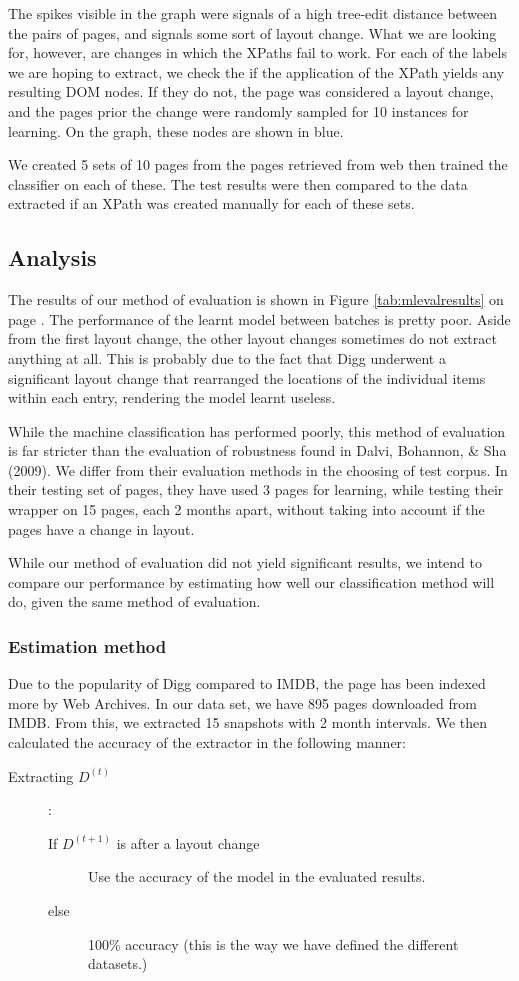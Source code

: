 	The spikes visible in the graph were signals of a high tree-edit distance between the pairs
of pages, and signals some sort of layout change. What we are looking for, however, are changes
in which the XPaths fail to work. For each of the labels we are hoping to extract, we check the
if the application of the XPath yields any resulting DOM nodes. If they do not, the page was
considered a layout change, and the pages prior the change were randomly sampled for 10 instances
for learning. On the graph, these nodes are shown in blue.

	 We created 5 sets of 10 pages from the pages retrieved from web
then trained the classifier on each of these. The test results were then compared to the data
extracted if an XPath was created manually for each of these sets.
 
 
\subsection{Analysis}
	The results of our method of evaluation is shown in Figure \ref{tab:mlevalresults} on page
\pageref{tab:mlevalresults}. The performance of the learnt model between batches is pretty poor.
Aside from the first layout change, the other layout changes sometimes do not extract anything
at all. This is probably due to the fact that Digg underwent a significant layout change that
rearranged the locations of the individual items within each entry, rendering the model learnt
useless.
	
	While the machine classification has performed poorly, this method of evaluation is far
stricter than the evaluation of robustness found in Dalvi, Bohannon, \& Sha (2009).
We differ from their evaluation methods in the choosing of test corpus. In their testing
set of pages, they have used 3 pages for learning, while testing their wrapper on 15 pages,
each 2 months apart, without taking into account if the pages have a change in layout.

	While our method of evaluation did not yield significant results, we intend to compare
our performance by estimating how well our classification method will do, given the same
method of evaluation.
\subsubsection{Estimation method}
Due to the popularity of Digg compared to IMDB, the page has been indexed more by Web Archives.
In our data set, we have 895 pages downloaded from IMDB. From this, we extracted 15 snapshots
with 2 month intervals. We then calculated the accuracy of the extractor in the following manner:
\begin{description}
\item[Extracting $D^{(t)}$]:
\begin{description}
	\item[If $D^{(t+1)}$ is after a layout change] Use the accuracy of the model in the evaluated results.
	\item[else] 100\% accuracy (this is the way we have defined the different datasets.)
\end{description}
\end{description}

